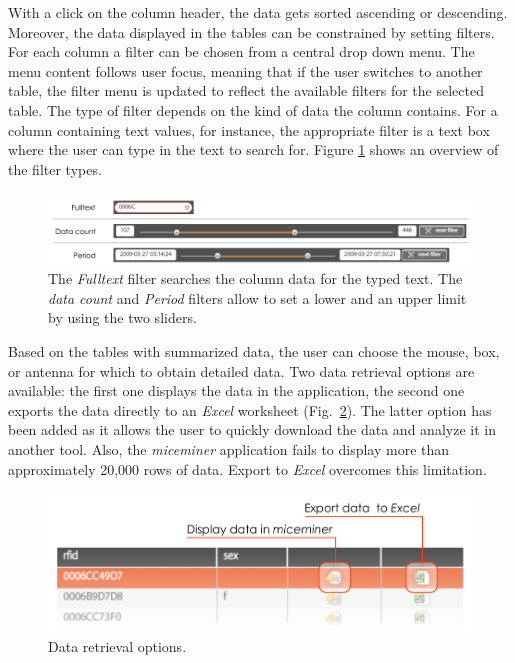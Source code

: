 With a click on the column header, the data gets sorted ascending or descending. Moreover, the data displayed in the tables can be constrained by setting filters. For each column a filter can be chosen from a central drop down menu. The menu content follows user focus, meaning that if the user switches to another table, the filter menu is updated to reflect the available filters for the selected table. The type of filter depends on the kind of data the column contains. For a column containing text values, for instance, the appropriate filter is a text box where the user can type in the text to search for. Figure \ref{fig:filter_types} shows an overview of the filter types.

\begin{figure}[htpb]
\begin{center}
  \includegraphics[width=.75\textwidth]{assets/pdf/filter_types.pdf}
  \caption[Filter types]{The \textit{Fulltext} filter searches the column data for the typed text. The \textit{data count} and \textit{Period} filters allow to set a lower and an upper limit by using the two sliders.}
  \label{fig:filter_types}
\end{center}
\end{figure}

Based on the tables with summarized data, the user can choose the mouse, box, or antenna for which to obtain detailed data. Two data retrieval options are available: the first one displays the data in the application, the second one exports the data directly to an \textit{Excel} worksheet (Fig.~\ref{fig:get_data_options}). The latter option has been added as it allows the user to quickly download the data and analyze it in another tool. Also, the \textit{miceminer} application fails to display more than approximately 20,000 rows of data. Export to \textit{Excel} overcomes this limitation.   

\begin{figure}[htbp]
\begin{center}
  \includegraphics[width=.75\textwidth]{assets/pdf/get_data_options.pdf}
  \caption[Data retrieval options]{Data retrieval options.}
  \label{fig:get_data_options}
\end{center}
\end{figure}

